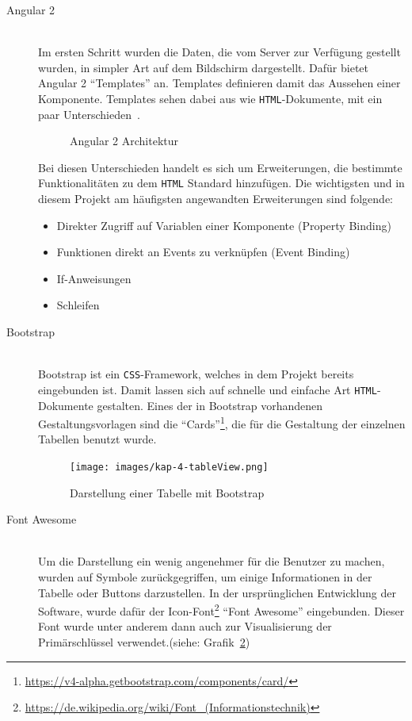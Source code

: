 \begin{description}
\item[Angular 2] \hfill\\
Im ersten Schritt wurden die Daten, die vom Server zur Verfügung gestellt wurden, in simpler Art auf dem Bildschirm dargestellt. 
Dafür bietet Angular 2 ``Templates'' an. Templates definieren damit das Aussehen einer Komponente. Templates sehen dabei aus wie \texttt{HTML}-Dokumente, mit ein paar Unterschieden~\cite{angular2_flow}.

\begin{figure}[ht]
    \centering
    \caption{Angular 2 Architektur}
    \label{pic:angular2_architecture}
\end{figure}

Bei diesen Unterschieden handelt es sich um Erweiterungen, die bestimmte Funktionalitäten zu dem \texttt{HTML} Standard hinzufügen. Die wichtigsten und in diesem Projekt am häufigsten angewandten Erweiterungen sind folgende:
\begin{itemize}
\item Direkter Zugriff auf Variablen einer Komponente (Property Binding)
\item Funktionen direkt an Events zu verknüpfen (Event Binding)
\item If-Anweisungen 
\item Schleifen
\end{itemize} 


\item[Bootstrap] \hfill\\
Bootstrap ist ein \texttt{CSS}-Framework, welches in dem Projekt bereits eingebunden ist. Damit lassen sich auf schnelle und einfache Art \texttt{HTML}-Dokumente gestalten. 
Eines der in Bootstrap vorhandenen Gestaltungsvorlagen sind die ``Cards''\footnote{\url{https://v4-alpha.getbootstrap.com/components/card/}}, die für die Gestaltung der einzelnen Tabellen benutzt wurde.

\begin{figure}[ht]
    \texttt{[image: images/kap-4-tableView.png]}
    \centering
    \caption{Darstellung einer Tabelle mit Bootstrap}
    \label{pic:table_boot}
\end{figure}

\item[Font Awesome] \hfill\\
Um die Darstellung ein wenig angenehmer für die Benutzer zu machen, wurden auf Symbole zurückgegriffen, um einige Informationen in der Tabelle oder Buttons darzustellen. In der ursprünglichen Entwicklung der Software, wurde dafür der Icon-Font\footnote{\url{https://de.wikipedia.org/wiki/Font_(Informationstechnik)}} ``Font Awesome'' eingebunden. Dieser Font wurde unter anderem dann auch zur Visualisierung der Primärschlüssel verwendet.(siehe: Grafik~\ref{pic:table_boot}) 


\end{description}
